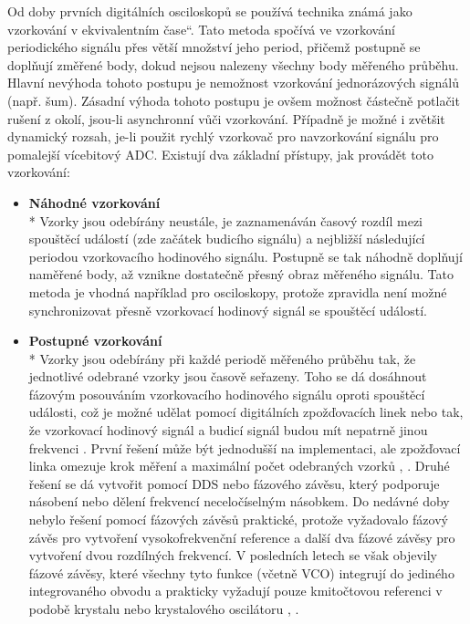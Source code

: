 Od doby prvních digitálních osciloskopů se používá technika známá jako vzorkování v \quotedblbase ekvivalentním čase\textquotedblleft . Tato metoda spočívá ve vzorkování periodického signálu přes větší množství jeho period, přičemž postupně se doplňují změřené body, dokud nejsou nalezeny všechny body měřeného průběhu. Hlavní nevýhoda tohoto postupu je nemožnost vzorkování jednorázových signálů (např. šum). Zásadní výhoda tohoto postupu je ovšem možnost částečně potlačit rušení z okolí, jsou-li asynchronní vůči vzorkování. Případně je možné i zvětšit dynamický rozsah, je-li použit rychlý vzorkovač pro navzorkování signálu pro pomalejší vícebitový \acrshort{ADC}. Existují dva základní přístupy, jak provádět toto vzorkování:
\begin{itemize}
	\item
		\textbf{Náhodné vzorkování}\\*		
		Vzorky jsou odebírány neustále, je zaznamenáván časový rozdíl mezi spouštěcí událostí (zde začátek budicího signálu) a nejbližší následující periodou vzorkovacího hodinového signálu. Postupně se tak náhodně doplňují naměřené body, až vznikne dostatečně přesný obraz měřeného signálu. Tato metoda je vhodná například pro osciloskopy, protože zpravidla není možné synchronizovat přesně vzorkovací hodinový signál se spouštěcí událostí.
		
	\item
		\textbf{Postupné vzorkování}\\*
		Vzorky jsou odebírány při každé periodě měřeného průběhu tak, že jednotlivé odebrané vzorky jsou časově seřazeny. Toho se dá dosáhnout fázovým posouváním vzorkovacího hodinového signálu oproti spouštěcí události, což je možné udělat pomocí digitálních zpožďovacích linek nebo tak, že vzorkovací hodinový signál a budicí signál budou mít nepatrně jinou frekvenci \cite{vernierreflectometer}. První řešení může být jednodušší na implementaci, ale zpožďovací linka omezuje krok měření a maximální počet odebraných vzorků \cite{fpgadelaylinereflectometer}, \cite{simpledelaylinereflectometer}. Druhé řešení se dá vytvořit pomocí \acrshort{DDS} \cite{ddsfpgareflectometer} nebo fázového závěsu, který podporuje násobení nebo dělení frekvencí neceločíselným násobkem. Do nedávné doby nebylo řešení pomocí fázových závěsů praktické, protože vyžadovalo fázový závěs pro vytvoření vysokofrekvenční reference a další dva fázové závěsy pro vytvoření dvou rozdílných frekvencí. V posledních letech se však objevily fázové závěsy, které všechny tyto funkce (včetně \acrshort{VCO}) integrují do jediného integrovaného obvodu a prakticky vyžadují pouze kmitočtovou referenci v podobě krystalu nebo krystalového oscilátoru \cite{ADF4350datasheet}, \cite{Si5351datasheet}.
\end{itemize}

